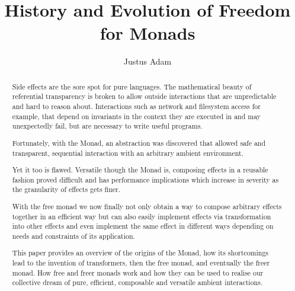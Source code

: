 \documentclass[sigconf]{acmart}
\begin{document}
\title{History and Evolution of Freedom for Monads}

\author{Justus Adam}
\affiliation{}


\begin{abstract}
Side effects are the sore spot for pure languages. The mathematical beauty of
referential transparency is broken to allow outside interactions that are
unpredictable and hard to reason about. Interactions such as network and
filesystem access for example, that depend on invariants in the context they are
executed in and may unexpectedly fail, but are necessary to write useful
programs.

Fortunately, with the Monad, an abstraction was discovered that allowed
safe and transparent, sequential interaction with an arbitrary ambient
environment.

Yet it too is flawed. Versatile though the Monad is, composing effects in a
reusable fashion proved difficult and has performance implications which
increase in severity as the granularity of effects gets finer.

With the free monad we now finally not only obtain a way to compose
arbitrary effects together in an efficient way but can also easily
implement effects via transformation into other effects and even
implement the same effect in different ways depending on needs and
constraints of its application.

This paper provides an overview of the origins of the Monad, how its
shortcomings lead to the invention of transformers, then the free
monad, and eventually the freer monad. How free and freer monads work
and how they can be used to realise our collective dream of pure,
efficient, composable and versatile ambient interactions.
\end{abstract}

\maketitle









\end{document}
